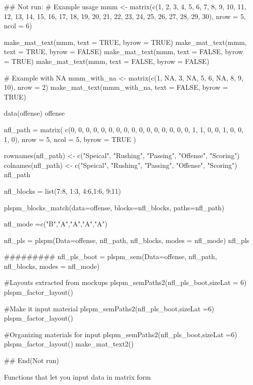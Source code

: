\documentclass[a4paper]{book}
\begin{document}
\begin{Examples}
\begin{ExampleCode}

## Not run: 
# Example usage
mmm <- matrix(c(1, 2, 3, 4, 5, 6, 7, 8, 9,
10, 11, 12, 13, 14, 15, 16, 17, 18, 19, 20,
21, 22, 23, 24, 25, 26, 27, 28, 29, 30),
 nrow = 5, ncol = 6)

make_mat_text(mmm, text = TRUE, byrow = TRUE)
make_mat_text(mmm, text = TRUE, byrow = FALSE)
make_mat_text(mmm, text = FALSE, byrow = TRUE)
make_mat_text(mmm, text = FALSE, byrow = FALSE)

# Example with NA
mmm_with_na <- matrix(c(1, NA, 3, NA, 5, 6, NA, 8, 9, 10), nrow = 2)
make_mat_text(mmm_with_na, text = FALSE, byrow = TRUE)

data(offense)
offense %

nfl_path = matrix(
  c(0, 0, 0, 0, 0,
    0, 0, 0, 0, 0,
    0, 0, 0, 0, 0,
    0, 1, 1, 0, 0,
    1, 0, 0, 1, 0),
  nrow = 5, ncol = 5, byrow = TRUE )

rownames(nfl_path) <- c("Speical", "Rushing",
"Passing", "Offense", "Scoring")
colnames(nfl_path) <- c("Speical", "Rushing",
"Passing", "Offense", "Scoring")
nfl_path

nfl_blocks = list(7:8, 1:3, 4:6,1:6, 9:11)

plspm_blocks_match(data=offense, blocks=nfl_blocks,
                   paths=nfl_path)

nfl_mode =c("B","A","A","A","A")

nfl_pls = plspm(Data=offense, nfl_path, nfl_blocks, modes = nfl_mode)
nfl_pls%

#########
nfl_pls_boot = plspm_sem(Data=offense, nfl_path,
 nfl_blocks, modes = nfl_mode)

#Layouts extracted from mockups
plspm_semPaths2(nfl_pls_boot,sizeLat = 6)%
  plspm_factor_layout()

#Make it input material
plspm_semPaths2(nfl_pls_boot,sizeLat =6)%
  plspm_factor_layout() %

#Organizing materials for input
plspm_semPaths2(nfl_pls_boot,sizeLat =6)%
  plspm_factor_layout() %
  make_mat_text2()

## End(Not run)

\end{ExampleCode}
\end{Examples}
%
\begin{Description}
Functions that let you input data in matrix form
\end{Description}
\end{document}
